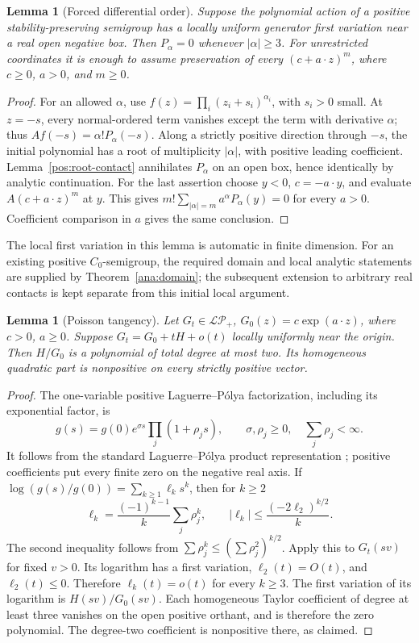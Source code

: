 \documentclass[reqno]{amsart}
\newtheorem{lemma}[theorem]{Lemma}
\theoremstyle{definition}
\theoremstyle{remark}
\begin{document}
\begin{lemma}[Forced differential order]\label{pos:order}
Suppose the polynomial action of a positive stability-preserving semigroup has a
locally uniform generator first variation near a real open negative box.
Then \(P_\alpha=0\) whenever \(|\alpha|\ge3\).
For unrestricted coordinates it is enough to assume preservation of every
\((c+a\cdot z)^m\), where \(c\ge0\), \(a>0\), and \(m\ge0\).
\end{lemma}
\begin{proof}
For an allowed \(\alpha\), use
\(f(z)=\prod_i(z_i+s_i)^{\alpha_i}\), with \(s_i>0\) small.
At \(z=-s\), every normal-ordered term vanishes except the term with derivative
\(\alpha\); thus \(Af(-s)=\alpha!P_\alpha(-s)\).
Along a strictly positive direction through \(-s\), the initial polynomial has a
root of multiplicity \(|\alpha|\), with positive leading coefficient.
Lemma~\ref{pos:root-contact} annihilates \(P_\alpha\) on an open box, hence
identically by analytic continuation.  For the last assertion choose \(y<0\),
\(c=-a\cdot y\), and evaluate \(A(c+a\cdot z)^m\) at \(y\).  This gives
\(m!\sum_{|\alpha|=m}a^\alpha P_\alpha(y)=0\) for every \(a>0\).
Coefficient comparison in \(a\) gives the same conclusion.
\end{proof}

The local first variation in this lemma is automatic in finite dimension.  For
an existing positive \(C_0\)-semigroup, the required domain and local analytic
statements are supplied by Theorem~\ref{ana:domain}; the subsequent extension
to arbitrary real contacts is kept separate from this initial local argument.

\begin{lemma}[Poisson tangency]\label{pos:poisson}
Let \(G_t\in\mathcal{LP}_+\), \(G_0(z)=c\exp(a\cdot z)\), where \(c>0\), \(a\ge0\).
Suppose \(G_t=G_0+tH+o(t)\) locally uniformly near the origin.  Then
\(H/G_0\) is a polynomial of total degree at most two.  Its homogeneous quadratic
part is nonpositive on every strictly positive vector.
\end{lemma}
\begin{proof}
The one-variable positive Laguerre--P\'olya factorization, including its exponential
factor, is
\[
 g(s)=g(0)e^{\sigma s}\prod_j(1+\rho_js),
 \qquad \sigma,\rho_j\ge0,\quad \sum_j\rho_j<\infty.
\]
It follows from the standard Laguerre--P\'olya product representation
\cite{LVR10}; positive coefficients put every finite zero on the negative real axis.
If \(\log(g(s)/g(0))=\sum_{k\ge1}\ell_ks^k\), then for \(k\ge2\)
\[
 \ell_k=\frac{(-1)^{k-1}}k\sum_j\rho_j^k,
 \qquad
 |\ell_k|\le\frac{(-2\ell_2)^{k/2}}k.
\]
The second inequality follows from
\(\sum\rho_j^k\le(\sum\rho_j^2)^{k/2}\).
Apply this to \(G_t(sv)\) for fixed \(v>0\).  Its logarithm has a first variation,
\(\ell_2(t)=O(t)\), and \(\ell_2(t)\le0\).  Therefore
\(\ell_k(t)=o(t)\) for every \(k\ge3\).
The first variation of its logarithm is \(H(sv)/G_0(sv)\).
Each homogeneous Taylor coefficient of degree at least three vanishes on the open
positive orthant, and is therefore the zero polynomial.  The degree-two coefficient
is nonpositive there, as claimed.
\end{proof}
\end{document}
